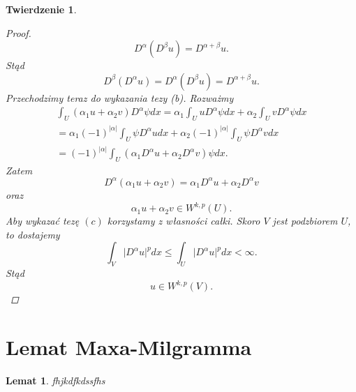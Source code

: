 \documentclass[12pt,a4paper,oneside,titlepage]{article}
\newtheorem{Twierdzenie}{Twierdzenie}
\newtheorem{Lemat}{Lemat}
\begin{document}
\begin{Twierdzenie}
\begin{proof}
\begin{equation}
\nonumber
D^{\alpha} \left( D^{\beta} u \right) = D^{\alpha+\beta}u .
\end{equation}
Stąd
\begin{equation}
\nonumber
D^{\beta} \left( D^{\alpha} u \right) = D^{\alpha} \left( D^{\beta} u \right) = D^{\alpha+\beta}u .
\end{equation}
Przechodzimy teraz do wykazania tezy (b). Rozważmy
\begin{equation}
\nonumber
\begin{split}
\int_{U} \left( \alpha_1 u + \alpha_2 v \right) D^{\alpha}\psi dx = \alpha_1 \int_{U} u D^{\alpha} \psi dx + \alpha_2 \int_{U}  v D^{\alpha} \psi dx \\ = \alpha_1 (-1)^{\vert \alpha \vert} \int_{U} \psi D^{\alpha} u  dx + \alpha_2 (-1)^{\vert \alpha \vert} \int_{U} \psi D^{\alpha} v  dx \\ =  (-1)^{\vert \alpha \vert} \int_{U} \left( \alpha_1 D^{\alpha} u + \alpha_2 D^{\alpha} v \right) \psi dx .
\end{split}
\end{equation}
Zatem
\begin{equation}
\nonumber
D^{\alpha}(\alpha_1 u + \alpha_2 v) = \alpha_1 D^{\alpha}u + \alpha_2 D^{\alpha} v 
\end{equation}
oraz
\begin{equation}
\nonumber
\alpha_1 u +\alpha_2 v \in W^{k,p}(U) .
\end{equation}
Aby wykazać tezę $(c)$ korzystamy z własności całki. Skoro $V$ jest podzbiorem $U$, to dostajemy
\begin{equation}
\nonumber
\int_{V} \vert D^{\alpha} u \vert^{p} dx \leq \int_{U} \vert D^{\alpha} u \vert^{p} dx < \infty .
\end{equation}
Stąd
\begin{equation}
\nonumber
u \in W^{k,p}(V) .
\end{equation}
\end{proof}
\end{Twierdzenie}
\newpage
\section{Lemat Maxa-Milgramma}
\begin{Lemat} fhjkdfkdssfhs
\end{Lemat}
\end{document}
